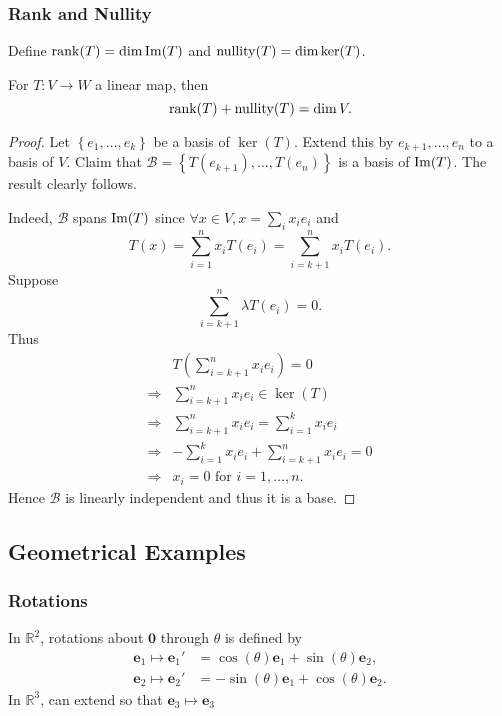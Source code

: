 \documentclass[a4paper]{article}
\begin{document}
\subsubsection{Rank and Nullity}
Define $ \rank(T)=\dim \operatorname{Im}(T) $ and $ \operatorname{nullity}(T)=\dim \ker(T) $.
\begin{theorem}\label{thm:r-n thm}
  For $ T:V\to W $ a linear map, then
  \[
    \rank(T)+\operatorname{nullity}(T)=\dim V
  .\]
\end{theorem}
\begin{proof}
  Let $ \left\{ e_1,\dots,e_k\right\} $ be a basis of $\ker(T)$.
  Extend this by $ e_{k+1},\dots,e_n $ to a basis of $V$. Claim that
  $ \mathcal{B}=\left\{ T(e_{k+1}),\dots,T(e_n)\right\} $ is a basis
  of $\operatorname{Im}(T)$. The result clearly follows.

  Indeed, $ \mathcal{B} $ spans $\operatorname{Im}(T)$ since $ \forall x\in V,
  x=\sum_{i}x_ie_i $ and
  \[
    T(x)=\sum_{i=1}^{n}x_iT(e_i)=\sum_{i=k+1}^{n}x_iT(e_i)
  .\]
  Suppose
  \[
    \sum_{i=k+1}^{n}\lambda T(e_i)=0
  .\]
  Thus
  \[
    \begin{aligned}
      &T\left( \sum_{i=k+1}^{n}x_ie_i \right)=0\\
      \Longrightarrow & \sum_{i=k+1}^{n}x_ie_i\in \ker(T)\\
      \Longrightarrow & \sum_{i=k+1}^{n}x_ie_i=\sum_{i=1}^{k}x_ie_i\\
      \Longrightarrow & -\sum_{i=1}^{k}x_i e_i+\sum_{i=k+1}^{n}x_ie_i=0\\
      \Longrightarrow &x_i=0 \text{ for } i=1,\dots,n.
    \end{aligned}
  \]
  Hence $ \mathcal{B} $ is linearly independent and thus it is a base.
\end{proof}
\subsection{Geometrical Examples}
\subsubsection{Rotations}
In $ \mathbb{R}^{2} $, rotations about $\mathbf{0}$ through $ \theta
$ is defined by
\[
  \begin{aligned}
    \mathbf{e}_1\mapsto
    \mathbf{e}_1'&=\cos(\theta)\mathbf{e}_1+\sin(\theta)\mathbf{e}_2,\\
    \mathbf{e}_2\mapsto
    \mathbf{e}_2'&=-\sin(\theta)\mathbf{e}_1+\cos(\theta)\mathbf{e}_2.
\end{aligned}\]
In $ \mathbb{R}^{3} $, can extend so that $ \mathbf{e}_3\mapsto \mathbf{e}_3 $
\end{document}
